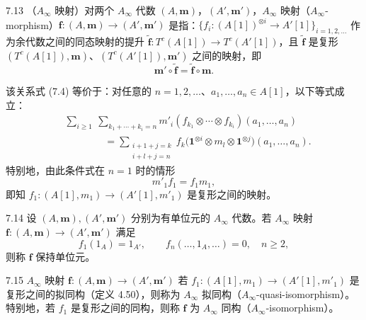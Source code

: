 \begin{definition}{7.13}
（$A_\infty$ 映射）对两个 $A_\infty$ 代数 $(A,\mathbf m)$，$(A',\mathbf m')$，$A_\infty$ 映射（$A_\infty$-morphism）$\mathbf f\colon(A,\mathbf m)\to(A',\mathbf m')$ 是指：$\{f_{i}\colon(A[1])^{\otimes i}\to A'[1]\}_{i=1,2,\dots}$ 作为余代数之间的同态映射的提升 $\tilde{\mathbf f}\colon T^{c}(A[1])\to T^{c}(A'[1])$，且 $\tilde{\mathbf f}$ 是复形 $(T^{c}(A[1]),\mathbf m)$、$(T^{c}(A'[1]),\mathbf m')$ 之间的映射，即
\begin{equation}
  \mathbf m'\circ\tilde{\mathbf f}=\tilde{\mathbf f}\circ\mathbf m. \tag{7.4}
\end{equation}
\end{definition}

该关系式 (7.4) 等价于：对任意的 $n=1,2,\dots$、$a_{1},\dots,a_{n}\in A[1]$，以下等式成立：
\begin{align*}
  &\sum_{i\ge 1}\ \sum_{k_{1}+\cdots+k_{i}=n}m'_{i}(f_{k_{1}}\otimes\cdots\otimes f_{k_{i}})(a_{1},\dots,a_{n})\\
  &\qquad\qquad=\sum_{\substack{i+1+j=k\\ i+l+j=n}}f_{k}\bigl(\mathbf 1^{\otimes i}\otimes m_{l}\otimes\mathbf 1^{\otimes j}\bigr)(a_{1},\dots,a_{n}).
\end{align*}
特别地，由此条件式在 $n=1$ 时的情形
\[
  m'_{1}f_{1}=f_{1}m_{1},
\]
即知 $f_{1}\colon(A[1],m_{1})\to(A'[1],m'_{1})$ 是复形之间的映射。


\begin{definition}{7.14}
设 $(A,\mathbf m),(A',\mathbf m')$ 分别为有单位元的 $A_\infty$ 代数。若 $A_\infty$ 映射 $\mathbf f\colon(A,\mathbf m)\to(A',\mathbf m')$ 满足
\[
  f_{1}(1_{A})=1_{A'},\qquad f_{n}(\dots,1_{A},\dots)=0,\quad n\ge 2,
\]
则称 $\mathbf f$ 保持单位元。
\end{definition}


\begin{definition}{7.15}
$A_\infty$ 映射 $\mathbf f\colon(A,\mathbf m)\to(A',\mathbf m')$ 若 $f_{1}\colon(A[1],m_{1})\to(A'[1],m'_{1})$ 是复形之间的拟同构（定义 4.50），则称为 $A_\infty$ 拟同构（$A_\infty$-quasi-isomorphism）。特别地，若 $f_{1}$ 是复形之间的同构，则称 $\mathbf f$ 为 $A_\infty$ 同构（$A_\infty$-isomorphism）。
\end{definition}

